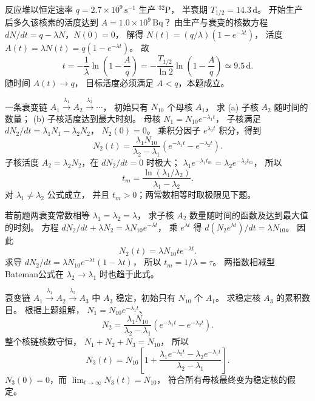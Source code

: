 反应堆以恒定速率
$q=2.7\times10^9\,\mathrm{s^{-1}}$
生产 $\mathrm{^{32}P}$，
半衰期 $T_{1/2}=14.3\,\mathrm d$。
开始生产后多久该核素的活度达到
$A=1.0\times10^9\,\mathrm{Bq}$？
\exsolution
由生产与衰变的核数方程
$dN/dt=q-\lambda N$，$N(0)=0$，
解得
$N(t)=(q/\lambda)(1-e^{-\lambda t})$，
活度
$A(t)=\lambda N(t)=q(1-e^{-\lambda t})$。
故
\[
 \boxed{t=-\frac1\lambda\ln\left(1-\frac Aq\right)
 =-\frac{T_{1/2}}{\ln2}\ln\left(1-\frac Aq\right)
 \simeq9.5\,\mathrm d}.
\]
\excheck 随时间 $A(t)\to q$，
目标活度必须满足 $A<q$，本题成立。

一条衰变链 $A_1\xrightarrow{\lambda_1}A_2
\xrightarrow{\lambda_2}\cdots$，
初始只有 $N_{10}$ 个母核 $A_1$，
求 (a) 子核 $A_2$ 随时间的数量；
(b) 子核活度达到最大时刻。
\exsolution
母核
$N_1=N_{10}e^{-\lambda_1t}$，
子核满足
$dN_2/dt=\lambda_1N_1-\lambda_2N_2$，
$N_2(0)=0$。
乘积分因子 $e^{\lambda_2t}$ 积分，得到
\[
 \boxed{N_2(t)=\frac{\lambda_1N_{10}}
 {\lambda_2-\lambda_1}
 (e^{-\lambda_1t}-e^{-\lambda_2t})}.
\]
子核活度 $A_2=\lambda_2N_2$，在
$dN_2/dt=0$ 时极大；
$\lambda_1e^{-\lambda_1t_m}
 =\lambda_2e^{-\lambda_2t_m}$，
所以
\[
 \boxed{t_m=\frac{\ln(\lambda_1/\lambda_2)}
 {\lambda_1-\lambda_2}}.
\]
\excheck 对 $\lambda_1\ne\lambda_2$ 公式成立，
并且 $t_m>0$；两常数相等时取极限见下题。

若前题两衰变常数相等
$\lambda_1=\lambda_2=\lambda$，
求子核 $A_2$ 数量随时间的函数及达到最大值的时刻。
\exsolution
方程
$dN_2/dt+\lambda N_2=
\lambda N_{10}e^{-\lambda t}$，
乘 $e^{\lambda t}$ 得
$d(N_2e^{\lambda t})/dt=\lambda N_{10}$。
因此
\[
 \boxed{N_2(t)=\lambda N_{10}t e^{-\lambda t}}.
\]
求导
$dN_2/dt=\lambda N_{10}e^{-\lambda t}(1-\lambda t)$，
所以
$\boxed{t_m=1/\lambda=\tau}$。
\excheck 两指数相减型
Bateman公式在 $\lambda_2\to\lambda_1$
时也趋于此式。

衰变链
$A_1\xrightarrow{\lambda_1}A_2
\xrightarrow{\lambda_2}A_3$
中 $A_3$ 稳定，初始只有 $N_{10}$ 个 $A_1$。
求稳定核 $A_3$ 的累积数目。
\exsolution
根据上题组解，
$N_1=N_{10}e^{-\lambda_1 t}$、
\[
 N_2=\frac{\lambda_1N_{10}}
 {\lambda_2-\lambda_1}
 (e^{-\lambda_1t}-e^{-\lambda_2t}).
\]
整个核链核数守恒，
$N_1+N_2+N_3=N_{10}$，
所以
\[
 \boxed{N_3(t)=N_{10}\left[
 1+\frac{\lambda_1e^{-\lambda_2t}
 -\lambda_2e^{-\lambda_1t}}
 {\lambda_2-\lambda_1}\right]}.
\]
\excheck $N_3(0)=0$，而
$\lim_{t\to\infty}N_3(t)=N_{10}$，
符合所有母核最终变为稳定核的假定。

